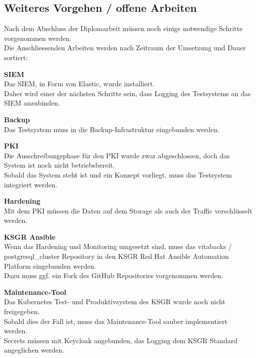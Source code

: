 
\begin{flushleft}
    \section{Weiteres Vorgehen / offene Arbeiten}
    Nach dem Abschluss der Diplomarbeit müssen noch einige notwendige Schritte vorgenommen werden.\\
    Die Anschliessenden Arbeiten werden nach Zeitraum der Umsetzung und Dauer sortiert:
    \begin{description}
        \item \textbf{\Gls{SIEM}}\hfill \\Das \Gls{SIEM}, in Form von Elastic, wurde installiert.\\Daher wird einer der nächsten Schritte sein, dass Logging des Testsystems an das \Gls{SIEM} anzubinden.
        \item \textbf{Backup}\hfill \\Das Testsystem muss in die Backup-Infrastruktur eingebunden werden.
        \item \textbf{\Gls{PKI}}\hfill \\Die Ausschreibungsphase für den \Gls{PKI} wurde zwar abgeschlossen, doch das System ist noch nicht betriebsbereit.\\Sobald das System steht  ist und ein Konzept vorliegt, muss das Testsystem integriert werden.
        \item \textbf{Hardening}\hfill \\Mit dem \Gls{PKI} müssen die Daten auf dem Storage als auch der Traffic verschlüsselt werden.
        \item \textbf{KSGR \Gls{Ansible}}\hfill \\Wenn das Hardening und Monitoring umgesetzt sind, muss das vitabacks / postgresql\_cluster Repository in den KSGR \Gls{Red Hat Ansible Automation Platform} eingebunden werden.\\Dazu muss ggf. ein Fork des  \Gls{GitHub} Repositories vorgenommen werden.
        \item \textbf{Maintenance-Tool}\hfill \\Das \Gls{Kubernetes} Test- und Produktivsystem des KSGR wurde noch nicht freigegeben.\\Sobald dies der Fall ist, muss das Maintenance-Tool sauber implementiert werden.\\Secrets müssen mit \Gls{Keycloak} angebunden, das Logging dem KSGR Standard angeglichen werden.

\end{description}
\end{flushleft}
